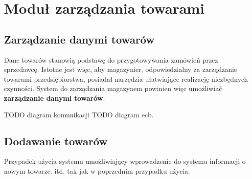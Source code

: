 \section{Moduł zarządzania towarami}
% 
\singlespacing
\subsection{Zarządzanie danymi towarów}

Dane towarów stanowią podstawę do przygotowywania zamówień przez
sprzedawcę. Istotne jest więc, aby magazynier, odpowiedzialny za
zarządzanie towarami przedsiębiorstwa, posiadał narzędzia 
ułatwiające realizację niezbędnych czynności. System
do zarządzania magazynem powinien więc umożliwiać \textbf{zarządzanie
danymi towarów}.

\begin{usecase}
\end{usecase}
TODO diagram komunikacji
TODO diagram ecb.
\subsection{Dodawanie towarów}
Przypadek użycia systemu umożliwiający wprowadzenie do systemu informacji
o nowym towarze.
itd. tak jak w poprzednim przypadku użycia.
